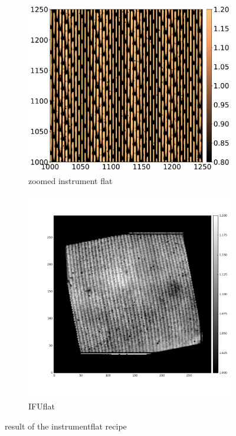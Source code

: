 \documentclass[twoside,single]{lion-msc}
\begin{document}
\begin{figure}[hb]
\centering
\begin{subfigure}{.5\textwidth}
  \centering
  \includegraphics[width=1\linewidth]{instrumentflat}
  \caption{zoomed instrument flat}
\end{subfigure}%
\begin{subfigure}{.5\textwidth}
  \centering
  \includegraphics[width=1\linewidth]{IFUflat}
  \caption{IFUflat}
\end{subfigure}
\caption{result of the instrumentflat recipe}
\label{fig:instrumentflatrecipe}
\end{figure}
\end{document}

